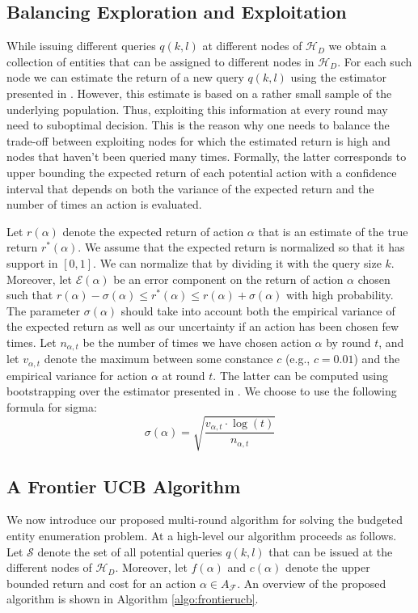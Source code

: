 \documentclass{vldb}
\newcommand{\hierarchy}{\mathcal{H}_D}
\begin{document}
\subsection{Balancing Exploration and Exploitation}
While issuing different queries $q(k,l)$ at different nodes of $\hierarchy$ we obtain a collection of entities that can be assigned to different nodes in $\hierarchy$. For each such node we can estimate the return of a new query $q(k,l)$ using the estimator presented in . However, this estimate is based on a rather small sample of the underlying population. Thus, exploiting this information at every round may need to suboptimal decision. This is the reason why one needs to balance the trade-off between exploiting nodes for which the estimated return is high and nodes that haven't been queried many times. Formally, the latter corresponds to upper bounding the expected return of each potential action with a confidence interval that depends on both the variance of the expected return and the number of times an action is evaluated.

Let $r(\alpha)$ denote the expected return of action $\alpha$ that is an estimate of the true return $r^*(\alpha)$. We assume that the expected return is normalized so that it has support in $[0,1]$. We can normalize that by dividing it with the query size $k$. Moreover, let $\mathcal{E}(\alpha)$ be an error component on the return of action $\alpha$ chosen such that $r(\alpha) - \sigma(\alpha) \leq r^*(\alpha) \leq r(\alpha) + \sigma(\alpha)$ with high probability. The parameter $\sigma(\alpha)$ should take into account both the empirical variance of the expected return as well as our uncertainty if an action has been chosen few times. Let $n_{\alpha,t}$ be the number of times we have chosen action $\alpha$ by round $t$, and let $v_{\alpha,t}$ denote the maximum between some constance $c$ (e.g., $c = 0.01$) and the empirical variance for action $\alpha$ at round $t$. The latter can be computed using bootstrapping over the estimator presented in . We choose to use the following formula for sigma:
\begin{equation}
\sigma(\alpha) = \sqrt{\frac{v_{\alpha,t}\cdot\log(t)}{n_{\alpha,t}}}
\end{equation}

\subsection{A Frontier UCB Algorithm}
We now introduce our proposed multi-round algorithm for solving the budgeted entity enumeration problem. At a high-level our algorithm proceeds as follows. Let $\mathcal{S}$ denote the set of all potential queries $q(k,l)$ that can be issued at the different nodes of $\hierarchy$. Moreover, let $f(\alpha)$ and $c(\alpha)$ denote the upper bounded return and cost for an action $\alpha \in A_{\mathcal{F}}$. An overview of the proposed algorithm is shown in Algorithm \ref{algo:frontierucb}.
\end{document}
